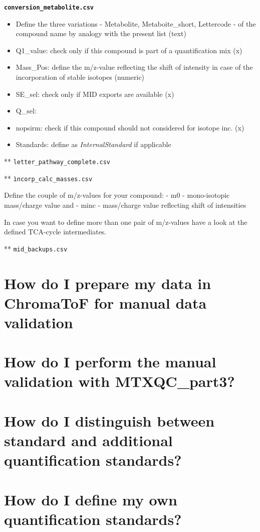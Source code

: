 \documentclass[]{book}
\providecommand{\tightlist}{%
  \setlength{\itemsep}{0pt}\setlength{\parskip}{0pt}}
\theoremstyle{definition}
\theoremstyle{definition}
\theoremstyle{definition}
\theoremstyle{remark}
\begin{document}
\textbf{\texttt{conversion\_metabolite.csv}}

\begin{itemize}
\tightlist
\item
  Define the three variations - Metabolite, Metaboite\_short, Lettercode
  - of the compound name by analogy with the present list (text)
\item
  Q1\_value: check only if this compound is part of a quantification mix
  (x)
\item
  Mass\_Pos: define the m/z-value reflecting the shift of intensity in
  case of the incorporation of stable isotopes (numeric)
\item
  SE\_sel: check only if MID exports are available (x)
\item
  Q\_sel:
\item
  nopsirm: check if this compound should not considered for isotope inc.
  (x)
\item
  Standards: define as \emph{InternalStandard} if applicable
\end{itemize}

** \texttt{letter\_pathway\_complete.csv}

** \texttt{ìncorp\_calc\_masses.csv}

Define the couple of m/z-values for your compound: - m0 - mono-isotopic
mass/charge value and - minc - mass/charge value reflecting shift of
intensities

In case you want to define more than one pair of m/z-values have a look
at the defined TCA-cycle intermediates.

** \texttt{mid\_backups.csv}

\section{How do I prepare my data in ChromaToF for manual data
validation}\label{howmanval-chroma}

\section{How do I perform the manual validation with
MTXQC\_part3?}\label{howmanval-part3}

\section{How do I distinguish between standard and additional
quantification standards?}\label{quantquant}

\section{How do I define my own quantification
standards?}\label{quantind}
\end{document}
